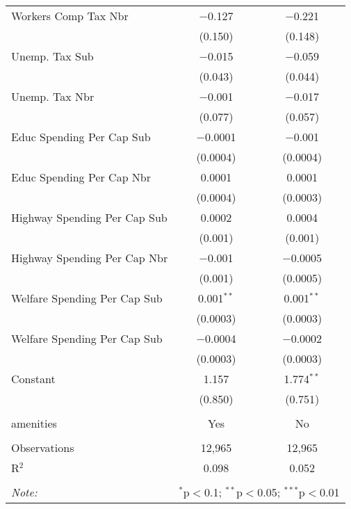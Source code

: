 \begin{table}[!htbp]
\begin{tabular}{@{\extracolsep{5pt}}lcc}
  Workers Comp Tax Nbr & $-$0.127 & $-$0.221 \\ 
  & (0.150) & (0.148) \\ 
  Unemp. Tax Sub & $-$0.015 & $-$0.059 \\ 
  & (0.043) & (0.044) \\ 
  Unemp. Tax Nbr & $-$0.001 & $-$0.017 \\ 
  & (0.077) & (0.057) \\ 
  Educ Spending Per Cap Sub & $-$0.0001 & $-$0.001 \\ 
  & (0.0004) & (0.0004) \\ 
  Educ Spending Per Cap Nbr & 0.0001 & 0.0001 \\ 
  & (0.0004) & (0.0003) \\ 
  Highway Spending Per Cap Sub & 0.0002 & 0.0004 \\ 
  & (0.001) & (0.001) \\ 
  Highway Spending Per Cap Nbr & $-$0.001 & $-$0.0005 \\ 
  & (0.001) & (0.0005) \\ 
  Welfare Spending Per Cap Sub & 0.001$^{**}$ & 0.001$^{**}$ \\ 
  & (0.0003) & (0.0003) \\ 
  Welfare Spending Per Cap Sub & $-$0.0004 & $-$0.0002 \\ 
  & (0.0003) & (0.0003) \\ 
  Constant & 1.157 & 1.774$^{**}$ \\ 
  & (0.850) & (0.751) \\ 
 \hline \\[-1.8ex] 
amenities & Yes & No \\ 
\hline \\[-1.8ex] 
Observations & 12,965 & 12,965 \\ 
R$^{2}$ & 0.098 & 0.052 \\ 
\hline 
\hline \\[-1.8ex] 
\textit{Note:}  & \multicolumn{2}{r}{$^{*}$p$<$0.1; $^{**}$p$<$0.05; $^{***}$p$<$0.01} \\ 
\end{tabular} 
\end{table} 
